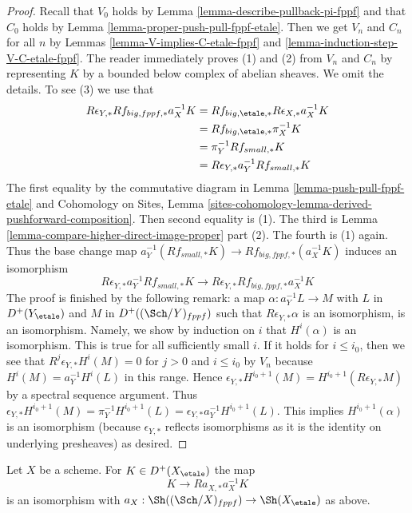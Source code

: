 \begin{proof}
Recall that $V_0$ holds by Lemma \ref{lemma-describe-pullback-pi-fppf}
and that $C_0$ holds by Lemma \ref{lemma-proper-push-pull-fppf-etale}.
Then we get $V_n$ and $C_n$ for all
$n$ by Lemmas \ref{lemma-V-implies-C-etale-fppf} and
\ref{lemma-induction-step-V-C-etale-fppf}.
The reader immediately proves (1) and (2) from $V_n$ and $C_n$
by representing $K$
by a bounded below complex of abelian sheaves. We omit the details.
To see (3) we use that
\begin{align*}
R\epsilon_{Y, *}Rf_{big, fppf, *}a_X^{-1}K
& =
Rf_{big, \etale, *}R\epsilon_{X, *}a_X^{-1}K \\
& =
Rf_{big, \etale, *}\pi_X^{-1}K \\
& =
\pi_Y^{-1}Rf_{small, *}K \\
& =
R\epsilon_{Y, *} a_Y^{-1}Rf_{small, *}K
\end{align*}
The first equality by the commutative diagram in
Lemma \ref{lemma-push-pull-fppf-etale}
and Cohomology on Sites, Lemma
\ref{sites-cohomology-lemma-derived-pushforward-composition}.
Then second equality is (1). The third is
Lemma \ref{lemma-compare-higher-direct-image-proper} part (2).
The fourth is (1) again.
Thus the base change map
$a_Y^{-1}(Rf_{small, *}K) \to Rf_{big, fppf, *}(a_X^{-1}K)$
induces an isomorphism
$$
R\epsilon_{Y, *}a_Y^{-1}Rf_{small, *}K \to
R\epsilon_{Y, *}Rf_{big, fppf, *}a_X^{-1}K
$$
The proof is finished by the following remark: a map
$\alpha : a_Y^{-1}L \to M$ with $L$ in $D^+(Y_\etale)$
and $M$ in $D^+((\Sch/Y)_{fppf})$ such that $R\epsilon_{Y, *}\alpha$
is an isomorphism, is an isomorphism. Namely, 
we show by induction on $i$ that $H^i(\alpha)$ is an isomorphism.
This is true for all sufficiently small $i$.
If it holds for $i \leq i_0$, then we see that
$R^j\epsilon_{Y, *}H^i(M) = 0$ for $j > 0$ and $i \leq i_0$
by $V_n$ because $H^i(M) = a_Y^{-1}H^i(L)$ in this range.
Hence $\epsilon_{Y, *}H^{i_0 + 1}(M) = H^{i_0 + 1}(R\epsilon_{Y, *}M)$
by a spectral sequence argument.
Thus $\epsilon_{Y, *}H^{i_0 + 1}(M) = \pi_Y^{-1}H^{i_0 + 1}(L) =
\epsilon_{Y, *}a_Y^{-1}H^{i_0 + 1}(L)$.
This implies $H^{i_0 + 1}(\alpha)$ is an isomorphism
(because $\epsilon_{Y, *}$ reflects isomorphisms as it is the
identity on underlying presheaves) as desired.
\end{proof}

\begin{lemma}
\label{lemma-cohomological-descent-etale-fppf}
Let $X$ be a scheme. For $K \in D^+(X_\etale)$ the map
$$
K \longrightarrow Ra_{X, *}a_X^{-1}K
$$
is an isomorphism with $a_X : \Sh((\Sch/X)_{fppf}) \to \Sh(X_\etale)$
as above.
\end{lemma}

